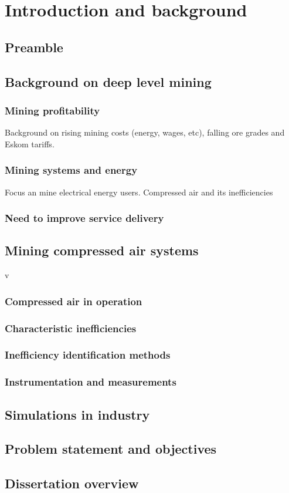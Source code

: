 \chapter{Introduction and background}  %
\setcounter{page}{1}
\section{Preamble}

\section{Background on deep level mining}

\subsection{Mining profitability}
Background on rising mining costs (energy, wages, etc), falling ore grades and Eskom tariffs.\cite{Nein_Tho}
%	


\subsection{Mining systems and energy}
Focus an mine electrical energy users. Compressed air and its inefficiencies
\subsection{Need to improve service delivery}
\section{Mining compressed air systems}v
	\subsection{Compressed air in operation}
	\subsection{Characteristic inefficiencies}
	\subsection{Inefficiency identification methods}
	\subsection{Instrumentation and measurements}
\section{Simulations in industry}
\section{Problem statement and objectives}
\section{Dissertation overview}